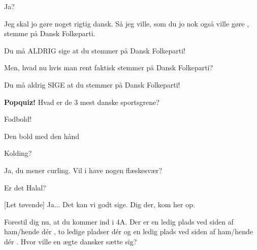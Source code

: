 \documentclass[a4paper,11pt]{article}
\begin{document}
\begin{sketch}


  Ja? 

  Jeg skal jo gøre noget rigtig dansk.
Så jeg ville, som du jo nok også ville gøre , stemme på Dansk Folkeparti.




  Du må ALDRIG sige at du stemmer på Dansk Folkeparti!

 Men, hvad nu hvis man rent faktisk stemmer på Dansk Folkeparti?

  Du må aldrig SIGE at du stemmer på Dansk Folkeparti!


  \textbf{Popquiz!} Hvad er de 3 mest danske sportsgrene?


  Fodbold!


  Den bold med den hånd 


  Kolding?

 Ja, du mener curling. Vil i have nogen flæskesvær?  


 Er det Halal?

[Let tøvende] Ja... Det kan vi godt sige.  Dig der, kom her op. 


 Forestil dig nu, at du kommer ind i 4A. Der er en ledig plads ved siden af
ham/hende dér , to ledige pladser dér 
og en ledig plads ved siden af ham/hende dér . Hvor ville en ægte dansker sætte sig?


\end{sketch}
\end{document}
